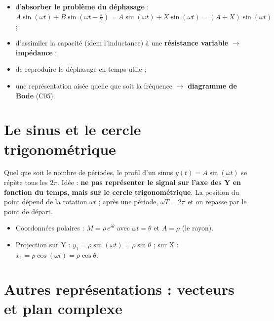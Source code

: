 \begin{rembox}[title={Objectif : un outil mathématique qui permet}]
\begin{itemize}
  \item d'\textbf{absorber le problème du déphasage} :
        $A\sin(\omega t) + B\sin(\omega t - \frac\pi2) = A\sin(\omega t) + X\sin(\omega t) = (A + X)\sin(\omega t)$ ;
  \item d'assimiler la capacité (idem l'inductance) à une \textbf{résistance variable}
        $\to$ \textbf{impédance} ;
  \item de reproduire le déphasage en temps utile ;
  \item une représentation aisée quelle que soit la fréquence $\to$ \textbf{diagramme de
        Bode} (C05).
\end{itemize}
\end{rembox}

\section{Le sinus et le cercle trigonométrique}


Quel que soit le nombre de périodes, le profil d'un sinus $y(t) = A\sin(\omega t)$ se répète
tous les $2\pi$. Idée : \textbf{ne pas représenter le signal sur l'axe des Y en fonction du
temps, mais sur le cercle trigonométrique}. La position du point dépend de la rotation
$\omega t$ ; après une période, $\omega T = 2\pi$ et on repasse par le point de départ.


\begin{defnbox}[title=Point M sur le cercle]
\begin{itemize}
  \item Coordonnées polaires : $M = \rho\,e^{i\theta}$ avec $\omega t = \theta$ et
        $A = \rho$ (le rayon).
  \item Projection sur Y : $y_1 = \rho\sin(\omega t) = \rho\sin\theta$ ; sur X :
        $x_1 = \rho\cos(\omega t) = \rho\cos\theta$.
\end{itemize}
\end{defnbox}

\section{Autres représentations : vecteurs et plan complexe}

